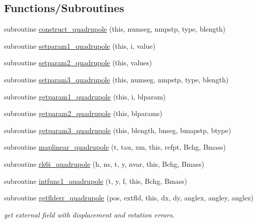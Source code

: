 \subsection*{Functions/\+Subroutines}
\begin{DoxyCompactItemize}
\item 
subroutine \mbox{\hyperlink{namespacequadrupoleclass_afebabbf596b8330dcdbc2741bb939b5c}{construct\+\_\+quadrupole}} (this, numseg, nmpstp, type, blength)
\item 
subroutine \mbox{\hyperlink{namespacequadrupoleclass_a34d611929c447e03e1c12c2f72888ca5}{setparam1\+\_\+quadrupole}} (this, i, value)
\item 
subroutine \mbox{\hyperlink{namespacequadrupoleclass_a400dc2305f0aca6ab6d6b5475a91363a}{setparam2\+\_\+quadrupole}} (this, values)
\item 
subroutine \mbox{\hyperlink{namespacequadrupoleclass_a6e3465265973203b8452b1b2463a2e4b}{setparam3\+\_\+quadrupole}} (this, numseg, nmpstp, type, blength)
\item 
subroutine \mbox{\hyperlink{namespacequadrupoleclass_a48e1ded5cfc486c78a47d556fd008e29}{getparam1\+\_\+quadrupole}} (this, i, blparam)
\item 
subroutine \mbox{\hyperlink{namespacequadrupoleclass_a8991350fe610b73bca6787f4c528753c}{getparam2\+\_\+quadrupole}} (this, blparams)
\item 
subroutine \mbox{\hyperlink{namespacequadrupoleclass_ae5c8a42ae81e07dcb9eb91681d28f04e}{getparam3\+\_\+quadrupole}} (this, blength, bnseg, bmapstp, btype)
\item 
subroutine \mbox{\hyperlink{namespacequadrupoleclass_adcdf5386d19cfb0a90cbc42426cf0d44}{maplinear\+\_\+quadrupole}} (t, tau, xm, this, refpt, Bchg, Bmass)
\item 
subroutine \mbox{\hyperlink{namespacequadrupoleclass_a156f69f00644d8511e9f1ee150504b83}{rk6i\+\_\+quadrupole}} (h, ns, t, y, nvar, this, Bchg, Bmass)
\item 
subroutine \mbox{\hyperlink{namespacequadrupoleclass_a3cbe01df676294387d1293468425aa70}{intfunc1\+\_\+quadrupole}} (t, y, f, this, Bchg, Bmass)
\item 
subroutine \mbox{\hyperlink{namespacequadrupoleclass_a41791f03ec33f0255e54ebc7b9519170}{getflderr\+\_\+quadrupole}} (pos, extfld, this, dx, dy, anglex, angley, anglez)
\begin{DoxyCompactList}\small\item\em get external field with displacement and rotation errors. \end{DoxyCompactList}\item 

\end{DoxyCompactItemize}
